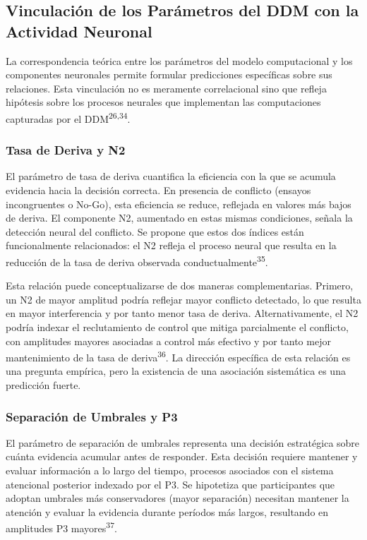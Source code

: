 \documentclass[
  spanish,
  10pt,
]{article}
\begin{document}
\subsection{Vinculación de los Parámetros del DDM con la Actividad
Neuronal}\label{vinculaciuxf3n-de-los-paruxe1metros-del-ddm-con-la-actividad-neuronal}

La correspondencia teórica entre los parámetros del modelo computacional
y los componentes neuronales permite formular predicciones específicas
sobre sus relaciones. Esta vinculación no es meramente correlacional
sino que refleja hipótesis sobre los procesos neurales que implementan
las computaciones capturadas por el DDM\textsuperscript{26,34}.

\subsubsection{Tasa de Deriva y N2}\label{tasa-de-deriva-y-n2}

El parámetro de tasa de deriva cuantifica la eficiencia con la que se
acumula evidencia hacia la decisión correcta. En presencia de conflicto
(ensayos incongruentes o No-Go), esta eficiencia se reduce, reflejada en
valores más bajos de deriva. El componente N2, aumentado en estas mismas
condiciones, señala la detección neural del conflicto. Se propone que
estos dos índices están funcionalmente relacionados: el N2 refleja el
proceso neural que resulta en la reducción de la tasa de deriva
observada conductualmente\textsuperscript{35}.

Esta relación puede conceptualizarse de dos maneras complementarias.
Primero, un N2 de mayor amplitud podría reflejar mayor conflicto
detectado, lo que resulta en mayor interferencia y por tanto menor tasa
de deriva. Alternativamente, el N2 podría indexar el reclutamiento de
control que mitiga parcialmente el conflicto, con amplitudes mayores
asociadas a control más efectivo y por tanto mejor mantenimiento de la
tasa de deriva\textsuperscript{36}. La dirección específica de esta
relación es una pregunta empírica, pero la existencia de una asociación
sistemática es una predicción fuerte.

\subsubsection{Separación de Umbrales y
P3}\label{separaciuxf3n-de-umbrales-y-p3}

El parámetro de separación de umbrales representa una decisión
estratégica sobre cuánta evidencia acumular antes de responder. Esta
decisión requiere mantener y evaluar información a lo largo del tiempo,
procesos asociados con el sistema atencional posterior indexado por el
P3. Se hipotetiza que participantes que adoptan umbrales más
conservadores (mayor separación) necesitan mantener la atención y
evaluar la evidencia durante períodos más largos, resultando en
amplitudes P3 mayores\textsuperscript{37}.
\end{document}

